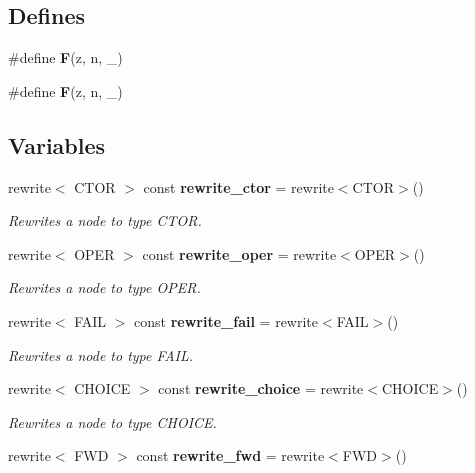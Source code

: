 \subsection*{Defines}
\begin{CompactItemize}
\item 
\#define {\bf F}(z, n, \_\-)
\item 
\#define {\bf F}(z, n, \_\-)
\end{CompactItemize}
\subsection*{Variables}
\begin{CompactItemize}
\item 
rewrite$<$ CTOR $>$ const {\bf rewrite\_\-ctor} = rewrite$<$CTOR$>$()\label{namespacesprite_a36}

\begin{CompactList}\small\item\em Rewrites a node to type CTOR. \item\end{CompactList}\item 
rewrite$<$ OPER $>$ const {\bf rewrite\_\-oper} = rewrite$<$OPER$>$()\label{namespacesprite_a37}

\begin{CompactList}\small\item\em Rewrites a node to type OPER. \item\end{CompactList}\item 
rewrite$<$ FAIL $>$ const {\bf rewrite\_\-fail} = rewrite$<$FAIL$>$()\label{namespacesprite_a38}

\begin{CompactList}\small\item\em Rewrites a node to type FAIL. \item\end{CompactList}\item 
rewrite$<$ CHOICE $>$ const {\bf rewrite\_\-choice} = rewrite$<$CHOICE$>$()\label{namespacesprite_a39}

\begin{CompactList}\small\item\em Rewrites a node to type CHOICE. \item\end{CompactList}\item 
rewrite$<$ FWD $>$ const {\bf rewrite\_\-fwd} = rewrite$<$FWD$>$()\label{namespacesprite_a40}


\end{CompactItemize}
